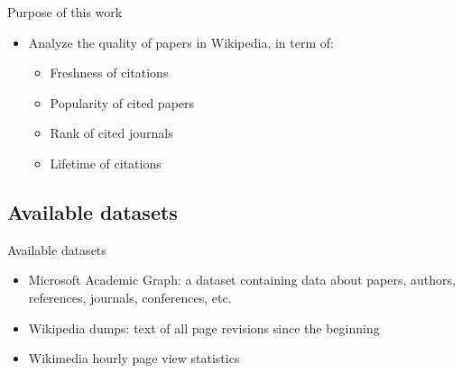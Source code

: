 \documentclass{beamer}
\begin{document}
\begin{frame}{Purpose of this work}
\begin{itemize}
    \item Analyze the quality of papers in Wikipedia, in term of:
    \begin{itemize}
        \item Freshness of citations
        \item Popularity of cited papers
        \item Rank of cited journals
        \item Lifetime of citations
    \end{itemize}
\end{itemize}
\end{frame}

%

\subsection{Available datasets}
\begin{frame}{Available datasets}
\begin{itemize}
    \item Microsoft Academic Graph: a dataset containing data about papers, authors, references, journals, conferences, etc.
    \item Wikipedia dumps: text of all page revisions since the beginning
    \item Wikimedia hourly page view statistics
\end{itemize}
\end{frame}
\end{document}
